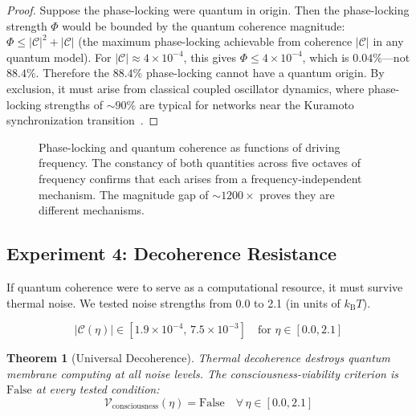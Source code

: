 \documentclass[12pt]{article}
\newtheorem{theorem}{Theorem}[section]
\theoremstyle{definition}
\theoremstyle{remark}
\newcommand{\kB}{k_{\mathrm{B}}}
\begin{document}
\begin{proof}
Suppose the phase-locking were quantum in origin. Then the phase-locking strength $\Phi$ would be bounded by the quantum coherence magnitude: $\Phi \leq |\mathcal{C}|^2 + |\mathcal{C}|$ (the maximum phase-locking achievable from coherence $|\mathcal{C}|$ in any quantum model). For $|\mathcal{C}| \approx 4 \times 10^{-4}$, this gives $\Phi \leq 4 \times 10^{-4}$, which is $0.04\%$---not $88.4\%$. Therefore the $88.4\%$ phase-locking cannot have a quantum origin. By exclusion, it must arise from classical coupled oscillator dynamics, where phase-locking strengths of $\sim 90\%$ are typical for networks near the Kuramoto synchronization transition~\citep{kuramoto1984chemical, strogatz2000nonlinear}. \qedhere
\end{proof}

\begin{figure}[H]
\centering
{}
\caption{Phase-locking and quantum coherence as functions of driving frequency. The constancy of both quantities across five octaves of frequency confirms that each arises from a frequency-independent mechanism. The magnitude gap of $\sim 1200\times$ proves they are different mechanisms.}
\label{fig:timescale}
\end{figure}

\subsection{Experiment 4: Decoherence Resistance}

If quantum coherence were to serve as a computational resource, it must survive thermal noise. We tested noise strengths from 0.0 to 2.1 (in units of $\kB T$).

\begin{equation}
\label{eq:decoherence_data}
|\mathcal{C}(\eta)| \in [1.9 \times 10^{-4}, \, 7.5 \times 10^{-3}] \quad \text{for } \eta \in [0.0, 2.1]
\end{equation}

\begin{theorem}[Universal Decoherence]
\label{thm:decoherence}
Thermal decoherence destroys quantum membrane computing at all noise levels. The consciousness-viability criterion is $\text{False}$ at every tested condition:
\begin{equation}
\label{eq:decoherence_fail}
\mathcal{V}_{\mathrm{consciousness}}(\eta) = \text{False} \quad \forall \, \eta \in [0.0, 2.1]
\end{equation}
\end{theorem}
\end{document}
